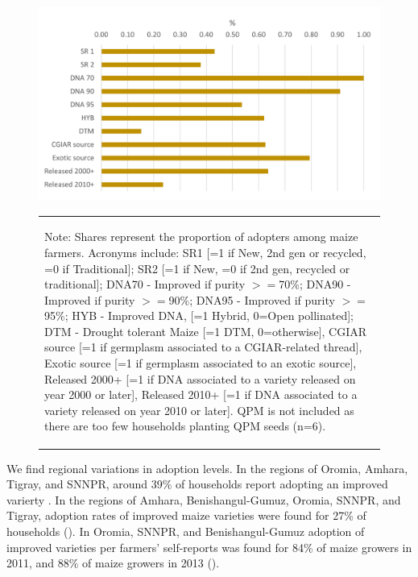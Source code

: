 \documentclass[11pt]{article}
\begin{document}
\begin{figure}[htpb]
    \centering
    \caption{Adoption rates of improved varieties in 2018 (by self-report, purity level, crop type, source and year of release)}\label{fig:adoption_r4}
    \includegraphics[width=.7\textwidth]{results/figures/adoption_r4.png}
    \begin{table}[H]
    \centering
        \begin{tabular}{p{}} 
            \begin{tablenotes}
                  \small
                  \item Note: Shares represent the proportion of adopters among maize farmers. Acronyms include: SR1 [=1 if New, 2nd gen or recycled, =0 if Traditional]; SR2  [=1 if New, =0 if 2nd gen, recycled or traditional]; DNA70 - Improved if purity $>=$70$\%$; DNA90 - Improved if purity $>=$90$\%$; DNA95 - Improved if purity $>=$95$\%$; HYB - Improved DNA, [=1 Hybrid, 0=Open pollinated]; DTM - Drought tolerant Maize [=1 DTM, 0=otherwise], CGIAR source [=1 if germplasm associated to a CGIAR-related thread], Exotic source [=1 if germplasm associated to an exotic source], Released 2000+ [=1 if DNA associated to a variety released on year 2000 or later], Released 2010+ [=1 if DNA associated to a variety released on year 2010 or later]. QPM is not included as there are too few households planting QPM seeds (n=6).
            \end{tablenotes}
        \end{tabular}
    \end{table}   
\end{figure}

We find regional variations in adoption levels. In the regions of Oromia, Amhara, Tigray, and SNNPR, around 39\% of households report adopting an improved varierty . In the regions of Amhara, Benishangul-Gumuz, Oromia, SNNPR, and Tigray, adoption rates of improved maize varieties were found for 27\% of households (\cite{Jaleta2018-oj}). In Oromia, SNNPR, and Benishangul-Gumuz adoption of improved varieties per farmers’ self-reports was found for 84\% of maize growers in 2011, and 88\% of maize growers in 2013 (\cite{Yirga17}).
\end{document}
